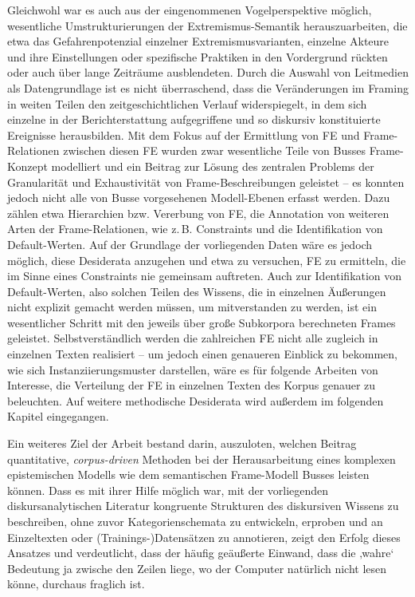 Gleichwohl war es auch aus der eingenommenen Vogelperspektive möglich, wesentliche Umstrukturierungen der Extremismus-Semantik herauszuarbeiten, die etwa das Gefahrenpotenzial einzelner Extremismusvarianten, einzelne Akteure und ihre Einstellungen oder spezifische Praktiken in den Vordergrund rückten oder auch über lange Zeiträume ausblendeten. Durch die Auswahl von Leitmedien als Datengrundlage ist es nicht überraschend, dass die Veränderungen im Framing in weiten Teilen den zeitgeschichtlichen Verlauf widerspiegelt, in dem sich einzelne in der Berichterstattung aufgegriffene und so diskursiv konstituierte Ereignisse herausbilden. Mit dem Fokus auf der Ermittlung von FE und Frame-Relationen zwischen diesen FE wurden zwar wesentliche Teile von Busses Frame-Konzept modelliert und ein Beitrag zur Lösung des zentralen Problems der Granularität und Exhaustivität von Frame-Beschreibungen geleistet -- es konnten jedoch nicht alle von Busse vorgesehenen Modell-Ebenen erfasst werden. Dazu zählen etwa Hierarchien bzw. Vererbung von FE, die Annotation von weiteren Arten der Frame-Relationen, wie z.\,B. Constraints und die Identifikation von Default-Werten. Auf der Grundlage der vorliegenden Daten wäre es jedoch möglich, diese Desiderata anzugehen und etwa zu versuchen, FE zu ermitteln, die im Sinne eines Constraints nie gemeinsam auftreten. Auch zur Identifikation von Default-Werten, also solchen Teilen des Wissens, die in einzelnen Äußerungen nicht explizit gemacht werden müssen, um mitverstanden zu werden, ist ein wesentlicher Schritt mit den jeweils über große Subkorpora berechneten Frames geleistet. Selbstverständlich werden die zahlreichen FE nicht alle zugleich in einzelnen Texten realisiert -- um jedoch einen genaueren Einblick zu bekommen, wie sich Instanziierungsmuster darstellen, wäre es für folgende Arbeiten von Interesse, die Verteilung der FE in einzelnen Texten des Korpus genauer zu beleuchten. Auf weitere methodische Desiderata wird außerdem im folgenden Kapitel eingegangen.

Ein weiteres Ziel der Arbeit bestand darin, auszuloten, welchen Beitrag quantitative, \emph{corpus-driven} Methoden bei der Herausarbeitung eines komplexen epistemischen Modells wie dem semantischen Frame-Modell Busses leisten können. Dass es mit ihrer Hilfe möglich war, mit der vorliegenden diskursanalytischen Literatur kongruente Strukturen des diskursiven Wissens zu beschreiben, ohne zuvor Kategorienschemata zu entwickeln, erproben und an Einzeltexten oder (Trainings\mbox{-})Datensätzen zu annotieren, zeigt den Erfolg dieses Ansatzes und verdeutlicht, dass der häufig geäußerte Einwand, dass die ‚wahre` Bedeutung ja zwische den Zeilen liege, wo der Computer natürlich nicht lesen könne, durchaus fraglich ist.


